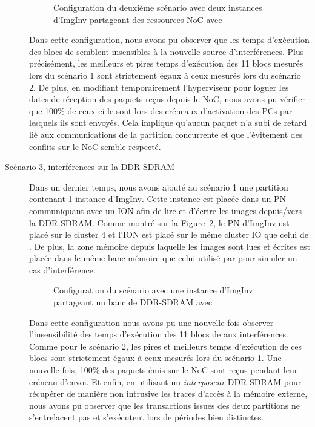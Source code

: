 \documentclass[main.tex]{subfiles}
\begin{document}
\begin{description}
        \begin{figure}
    \centering
    \scalebox{0.7}{}
    \caption{Configuration du deuxième scénario avec deux instances d'ImgInv partageant des ressources NoC avec \rosace}
    \label{fig_resumeFr_scenario2budget}
\end{figure}

Dans cette configuration, nous avons pu observer que les temps d'exécution des blocs de \rosace semblent insensibles à la nouvelle source d'interférences. Plus précisément, les meilleurs et pires temps d'exécution des 11 blocs mesurés lors du scénario 1 sont strictement égaux à ceux mesurés lors du scénario 2. De plus, en modifiant temporairement l'hyperviseur pour loguer les dates de réception des paquets reçus depuis le NoC, nous avons pu vérifier que 100\% de ceux-ci le sont lors des créneaux d'activation des PCs par lesquels ils sont envoyés. Cela implique qu'aucun paquet n'a subi de retard lié aux communications de la partition concurrente et que l'évitement des conflits sur le NoC semble respecté.





    \item[Scénario 3, interférences sur la DDR-SDRAM]
        Dans un dernier temps, nous avons ajouté au scénario 1 une partition contenant 1 instance d'ImgInv. Cette instance est placée dans un PN communiquant avec un ION afin de lire et d'écrire les images depuis/vers la DDR-SDRAM. Comme montré sur la Figure~\ref{fig_resumeFr_scenario3budget}, le PN d'ImgInv est placé sur le cluster 4 et l'ION est placé sur le même cluster IO que celui de \rosace. De plus, la zone mémoire depuis laquelle les images sont lues et écrites est placée dans le même banc mémoire que celui utilisé par \rosace pour simuler un cas d'interférence.
\begin{figure}
    \centering
    \scalebox{0.7}{}
    \caption{Configuration du scénario avec une instance d'ImgInv partageant un banc de DDR-SDRAM avec \rosace}
    \label{fig_resumeFr_scenario3budget}
\end{figure}

        Dans cette configuration nous avons pu une nouvelle fois observer l'insensibilité des temps d'exécution des 11 blocs de \rosace aux interférences. Comme pour le scénario 2, les pires et meilleurs temps d'exécution de ces blocs sont strictement égaux à ceux mesurés lors du scénario 1. Une nouvelle fois, 100\% des paquets émis sur le NoC sont reçus pendant leur créneau d'envoi. Et enfin, en utilisant un \emph{interposeur} DDR-SDRAM pour récupérer de manière non intrusive les traces d'accès à la mémoire externe, nous avons pu observer que les transactions issues des deux partitions ne s'entrelacent pas et s'exécutent lors de périodes bien distinctes.

\end{description}
\end{document}
